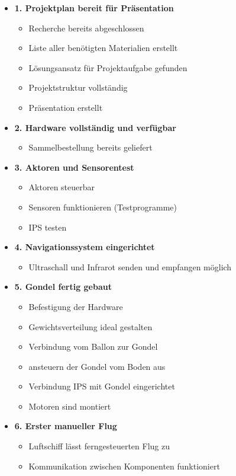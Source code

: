 \documentclass[lang=ngerman,inputenc=utf8,fontsize=10pt]{ldvarticle}
\begin{document}
\begin{itemize}
\item \textbf{1. Projektplan bereit für Präsentation}
\begin{itemize}
\item Recherche bereits abgeschlossen
\item Liste aller benötigten Materialien erstellt
\item Lösungsansatz für Projektaufgabe gefunden
\item Projektstruktur vollständig
\item Präsentation erstellt
\end{itemize}
\item \textbf{2. Hardware vollständig und verfügbar}
\begin{itemize}
\item Sammelbestellung bereits geliefert
\end{itemize}
\item \textbf{3. Aktoren und Sensorentest}
\begin{itemize}
\item Aktoren steuerbar
\item Sensoren funktionieren (Testprogramme)
\item IPS testen
\end{itemize}
\item \textbf{4. Navigationssystem eingerichtet}
\begin{itemize}
\item Ultraschall und Infrarot senden und empfangen möglich
\end{itemize}
\item \textbf{5. Gondel fertig gebaut}
\begin{itemize}
\item Befestigung der Hardware
\item Gewichtsverteilung ideal gestalten
\item Verbindung vom Ballon zur Gondel
\item ansteuern der Gondel vom Boden aus
\item Verbindung IPS mit Gondel eingerichtet
\item Motoren sind montiert
\end{itemize}
\item \textbf{6. Erster manueller Flug}
\begin{itemize}
\item Luftschiff lässt ferngesteuerten Flug zu
\item Kommunikation zwischen Komponenten funktioniert

\end{itemize}
\end{itemize}
\end{document}
